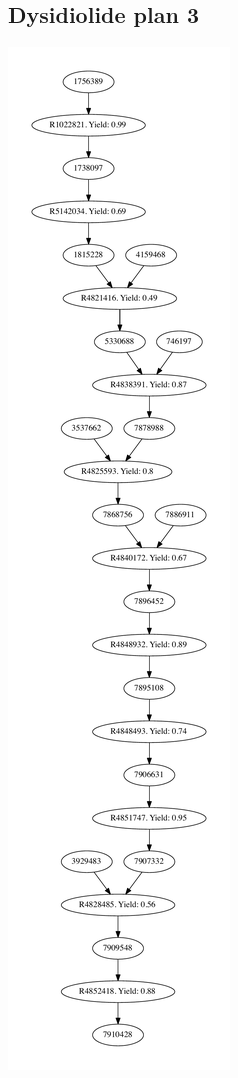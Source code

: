 \documentclass[a4paper,10pt,titlepage]{paper}
\begin{document}
\subsection{Dysidiolide plan 3}
\centering
\includegraphics[scale=0.34]{Synteseplaner/Dysidiolide/plan3.pdf}
\label{Appendix::Dysidiolide3}
\end{document}

